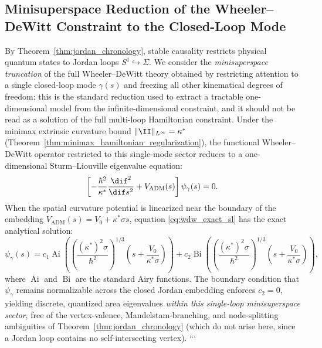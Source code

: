 \subsection{Minisuperspace Reduction of the Wheeler--DeWitt Constraint to the Closed-Loop Mode}
By Theorem~\ref{thm:jordan_chronology}, stable causality restricts physical quantum states to Jordan loops $S^1 \hookrightarrow \Sigma$. We consider the \emph{minisuperspace truncation} of the full Wheeler--DeWitt theory obtained by restricting attention to a single closed-loop mode $\gamma(s)$ and freezing all other kinematical degrees of freedom; this is the standard reduction used to extract a tractable one-dimensional model from the infinite-dimensional constraint, and it should not be read as a solution of the full multi-loop Hamiltonian constraint. Under the minimax extrinsic curvature bound $\|\II\|_{L^\infty} = \kappa^*$ (Theorem~\ref{thm:minimax_hamiltonian_regularization}), the functional Wheeler--DeWitt operator restricted to this single-mode sector reduces to a one-dimensional Sturm--Liouville eigenvalue equation:
\begin{equation}
    \label{eq:wdw_exact_sl}
    \left[ -\frac{\hbar^2}{\kappa^*} \frac{\dif^2}{\dif s^2} + V_{\mathrm{ADM}}(s) \right] \psi_\gamma(s) = 0.
\end{equation}
When the spatial curvature potential is linearized near the boundary of the embedding $V_{\mathrm{ADM}}(s) = V_0 + \kappa^* \sigma s$, equation \eqref{eq:wdw_exact_sl} has the exact analytical solution:
\begin{equation}
    \label{eq:wdw_airy_solution}
    \psi_\gamma(s) = c_1 \operatorname{Ai}\left( \left(\frac{(\kappa^*)^2 \sigma}{\hbar^2}\right)^{1/3} \left( s + \frac{V_0}{\kappa^* \sigma} \right) \right) + c_2 \operatorname{Bi}\left( \left(\frac{(\kappa^*)^2 \sigma}{\hbar^2}\right)^{1/3} \left( s + \frac{V_0}{\kappa^* \sigma} \right) \right),
\end{equation}
where $\operatorname{Ai}$ and $\operatorname{Bi}$ are the standard Airy functions. The boundary condition that $\psi_\gamma$ remains normalizable across the closed Jordan embedding enforces $c_2 = 0$, yielding discrete, quantized area eigenvalues \emph{within this single-loop minisuperspace sector}, free of the vertex-valence, Mandelstam-branching, and node-splitting ambiguities of Theorem~\ref{thm:jordan_chronology} (which do not arise here, since a Jordan loop contains no self-intersecting vertex).
```

